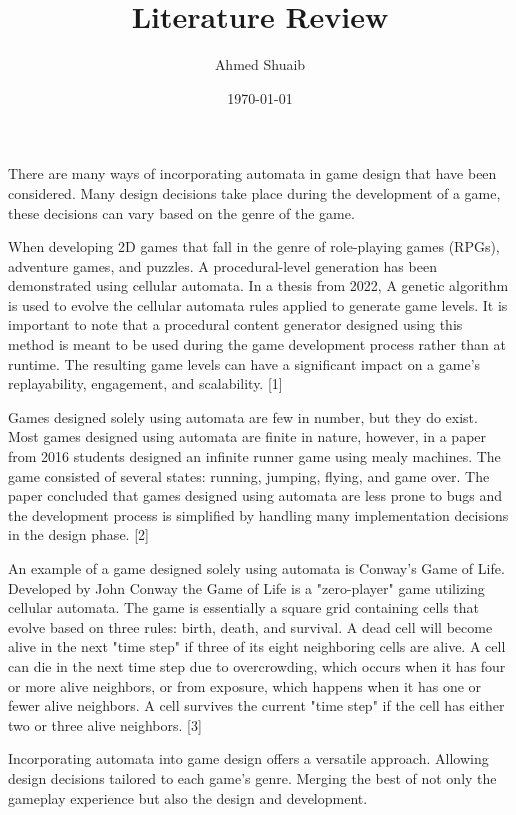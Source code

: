 \documentclass[12pt]{article}
\title{\vspace{-1in}\huge{Literature Review}}
\author{Ahmed Shuaib}
\date{\today}
\begin{document}
\maketitle
\vspace{-0.5in}
\section*{}
There are many ways of incorporating automata in game design that have been considered. Many design decisions take place during the development of a game, these decisions can vary based on the genre of the game.
\par
When developing 2D games that fall in the genre of role-playing games (RPGs), adventure games, and puzzles. A procedural-level generation has been demonstrated using cellular automata. In a thesis from 2022, A genetic algorithm is used to evolve the cellular automata rules applied to generate game levels. It is important to note that a procedural content generator designed using this method is meant to be used during the game development process rather than at runtime. The resulting game levels can have a significant impact on a game's replayability, engagement, and scalability. [1]
\par
Games designed solely using automata are few in number, but they do exist. Most games designed using automata are finite in nature, however, in a paper from 2016 students designed an infinite runner game using mealy machines. The game consisted of several states: running, jumping, flying, and game over. The paper concluded that games designed using automata are less prone to bugs and the development process is simplified by handling many implementation decisions in the design phase. [2]
\par
An example of a game designed solely using automata is Conway's Game of Life. Developed by John Conway the Game of Life is a "zero-player" game utilizing cellular automata. The game is essentially a square grid containing cells that evolve based on three rules: birth, death, and survival. A dead cell will become alive in the next "time step" if three of its eight neighboring cells are alive. A cell can die in the next time step due to overcrowding, which occurs when it has four or more alive neighbors, or from exposure, which happens when it has one or fewer alive neighbors. A cell survives the current "time step" if the cell has either two or three alive neighbors. [3]
\par
Incorporating automata into game design offers a versatile approach. Allowing design decisions tailored to each game's genre. Merging the best of not only the gameplay experience but also the design and development.
\end{document}
